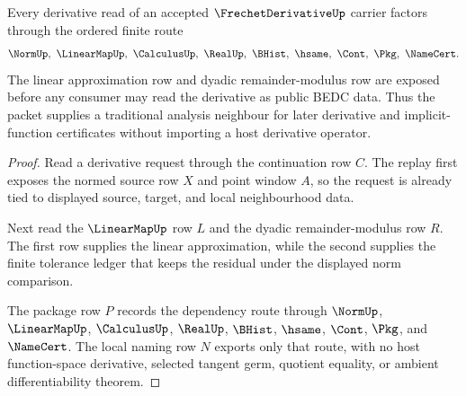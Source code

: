 \begin{theorem}
\label{thm:frechet-derivative-linear-remainder-handoff}
Every derivative read of an accepted $\FrechetDerivativeUp$ carrier factors through the ordered finite route
$$
\NormUp,\ \LinearMapUp,\ \CalculusUp,\ \RealUp,\ \BHist,\ \hsame,\ \Cont,\ \Pkg,\ \NameCert .
$$
The linear approximation row and dyadic remainder-modulus row are exposed before any consumer may read the derivative as public BEDC data. Thus the packet supplies a traditional analysis neighbour for later derivative and implicit-function certificates without importing a host derivative operator.
\end{theorem}
\begin{proof}
Read a derivative request through the continuation row $C$. The replay first exposes the normed source row $X$ and point window $A$, so the request is already tied to displayed source, target, and local neighbourhood data.

Next read the $\LinearMapUp$ row $L$ and the dyadic remainder-modulus row $R$. The first row supplies the linear approximation, while the second supplies the finite tolerance ledger that keeps the residual under the displayed norm comparison.

The package row $P$ records the dependency route through $\NormUp$, $\LinearMapUp$, $\CalculusUp$, $\RealUp$, $\BHist$, $\hsame$, $\Cont$, $\Pkg$, and $\NameCert$. The local naming row $N$ exports only that route, with no host function-space derivative, selected tangent germ, quotient equality, or ambient differentiability theorem.
\end{proof}




